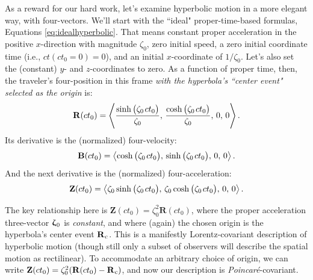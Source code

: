 \documentclass[12pt]{article}
\renewcommand{\vv}[1]{\mathbf{#1}}
\newcommand{\vvzeta}{\bm{\upzeta}}
\begin{document}
As a reward for our hard work, let's examine hyperbolic motion in a more elegant way, with four-vectors. We'll start with the ``ideal" proper-time-based formulas, Equations \ref{eq:idealhyperbolic}. That means constant proper acceleration in the positive $x$-direction with magnitude $\zeta_0$, zero initial speed, a zero initial coordinate time (i.e., $ct(ct_0 = 0) = 0$), and an initial $x$-coordinate of $1/\zeta_0$. Let's also set the (constant) $y$- and $z$-coordinates to zero. As a function of proper time, then, the traveler's four-position in this frame \emph{with the hyperbola's ``center event" selected as the origin} is:
\begin{equation}\label{eq:idealhyperbolicR}
\vv R (ct_0) = \left \langle \frac{\sinh \big( \zeta_0 \mkern2mu ct_0 \big)}{\zeta_0}, \, \frac{\cosh \big( \zeta_0 \mkern2mu ct_0 \big)}{\zeta_0}, \, 0, \, 0 \right \rangle .
\end{equation}
Its derivative is the (normalized) four-velocity:
\begin{equation}\label{eq:idealhyperbolicB}
\vv B (ct_0) = \left \langle \cosh \big( \zeta_0 \mkern2mu ct_0 \big), \, \sinh \big( \zeta_0 \mkern2mu ct_0 \big), \, 0, \, 0 \right \rangle .
\end{equation}
And the next derivative is the (normalized) four-acceleration:
\begin{equation*}
\vv Z (ct_0) = \left \langle  \zeta_0 \sinh \big( \zeta_0 \mkern2mu ct_0 \big), \,  \zeta_0 \cosh \big( \zeta_0 \mkern2mu ct_0 \big), \, 0, \, 0 \right \rangle .
\end{equation*}

The key relationship here is $\vv Z(ct_0) = \zeta_0^2 \vv R(ct_0)$, where the proper acceleration three-vector $\vvzeta_{\mkern1mu 0}$ is \emph{constant}, and where (again) the chosen origin is the hyperbola's center event $\vv R_{\mkern1mu \textrm{c}}$. This is a manifestly Lorentz-covariant description of hyperbolic motion (though still only a subset of observers will describe the spatial motion as rectilinear). To accommodate an arbitrary choice of origin, we can write ${\vv Z(ct_0) = \zeta_0^2 (\vv R(ct_0) - \vv R_{\mkern1mu \textrm{c}})}$, and now our description is \emph{Poincar\'e}-covariant.
\end{document}
